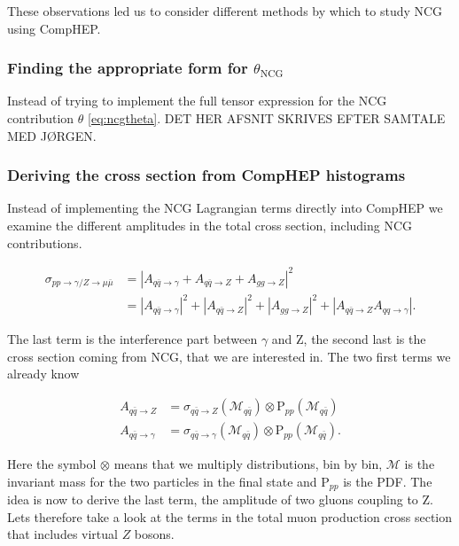 These observations led us to consider different methods by which to study NCG using CompHEP.

\subsubsection{Finding the appropriate form for $\theta_\textrm{NCG}$}
Instead of trying to implement the full tensor expression for the NCG contribution $\theta$ \eqref{eq:ncgtheta}. DET HER AFSNIT SKRIVES EFTER SAMTALE MED JØRGEN.

\subsubsection{Deriving the cross section from CompHEP histograms}
Instead of implementing the NCG Lagrangian terms directly into CompHEP we examine the different amplitudes in the total cross section, including NCG contributions.

\begin{align}
\sigma_{pp \rightarrow \gamma/ Z \rightarrow \mu \bar \mu} &= |A_{q \bar q \rightarrow \gamma} + A_{q \bar q \rightarrow Z} + A_{gg \rightarrow Z}|^{2} \nonumber \\
&= |A_{q \bar q \rightarrow \gamma}|^{2} + |A_{q \bar q \rightarrow Z}|^ {2} + |A_{gg \rightarrow Z}|^{2} + |A_{q \bar q \rightarrow Z }A_{qq \rightarrow \gamma}|.
\end{align}

The last term is the interference part between $\gamma$ and Z, the second last is the cross section coming from NCG, that we are interested in. The two first terms we already know

\begin{align}
A_{q \bar q \rightarrow Z} &= \sigma_{q \bar q \rightarrow Z} (\mathcal{M}_{q \bar q}) \otimes \textrm{P}_{pp}(\mathcal{M}_{q \bar q}) \nonumber \\ 
A_{q \bar q \rightarrow \gamma} &= \sigma_{q \bar q \rightarrow  \gamma}( \mathcal{M}_{q \bar q}) \otimes \textrm{P}_{pp}(\mathcal{M}_{q \bar q}).
\end{align}

Here the symbol $\otimes$ means that we multiply distributions, bin by bin, $\mathcal{M}$ is the invariant mass for the two particles in the final state and P$_{pp}$ is the PDF. The idea is now to derive the last term, the amplitude of two gluons coupling to Z. Lets therefore take a look at the terms in the total muon production cross section that includes virtual $Z$ bosons.

